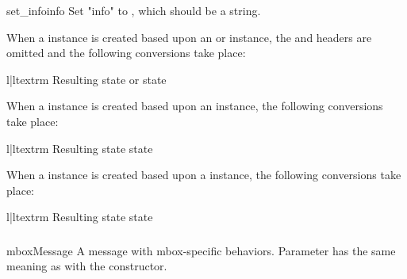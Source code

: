 \begin{methoddesc}{set_info}{info}
Set "info" to , which should be a string.
\end{methoddesc}

When a  instance is created based upon an
 or  instance, the 
and  headers are omitted and the following conversions
take place:

\begin{tableii}{l|l}{textrm}
    {Resulting state}{ or  state}
\end{tableii}

When a  instance is created based upon an
 instance, the following conversions take place:

\begin{tableii}{l|l}{textrm}
    {Resulting state}{ state}
\end{tableii}

When a  instance is created based upon a
 instance, the following conversions take place:

\begin{tableii}{l|l}{textrm}
    {Resulting state}{ state}
\end{tableii}

\subsubsection{}
\label{mailbox-mboxmessage}

\begin{classdesc}{mboxMessage}{}
A message with mbox-specific behaviors. Parameter  has the same
meaning as with the  constructor.
\end{classdesc}

